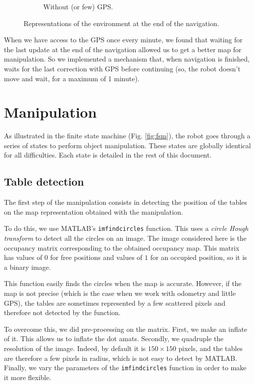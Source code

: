 \documentclass[a4paper, 10pt, conference]{ieeeconf}
\begin{document}
\begin{figure}[!h]
\begin{subfigure}[b]{0.23\textwidth}
            \caption{Without (or few) GPS.}
            \label{fig:navigation.map.nogps}
        \end{subfigure}
        \caption{Representations of the environment at the end of the navigation.}
        \label{fig:navigation.map}
    \end{figure}
    
    When we have access to the GPS once every minute, we found that waiting for the last update at the end of the navigation allowed us to get a better map for manipulation. So we implemented a mechanism that, when navigation is finished, waits for the last correction with GPS before continuing (so, the robot doesn't move and wait, for a maximum of 1 minute).
    
    
    \section{Manipulation}\label{sec:manipulation}
    
    As illustrated in the finite state machine (Fig. \ref{fig:fsm}), the robot goes through a series of states to perform object manipulation. These states are globally identical for all difficulties. Each state is detailed in the rest of this document.
    
    \subsection{Table detection}
    
    The first step of the manipulation consists in detecting the position of the tables on the map representation obtained with the manipulation.
    
    To do this, we use MATLAB's \texttt{imfindcircles} function. This uses a \emph{circle Hough transform} to detect all the circles on an image. The image considered here is the occupancy matrix corresponding to the obtained occupancy map. This matrix has values of $0$ for free positions and values of $1$ for an occupied position, so it is a binary image.
    
    This function easily finds the circles when the map is accurate. However, if the map is not precise (which is the case when we work with odometry and little GPS), the tables are sometimes represented by a few scattered pixels and therefore not detected by the function.
    
    To overcome this, we did pre-processing on the matrix. First, we make an inflate of it. This allows us to inflate the dot amats. Secondly, we quadruple the resolution of the image. Indeed, by default it is $150\times150$ pixels, and the tables are therefore a few pixels in radius, which is not easy to detect by MATLAB. Finally, we vary the parameters of the \texttt{imfindcircles} function in order to make it more flexible.
    
\end{document}
